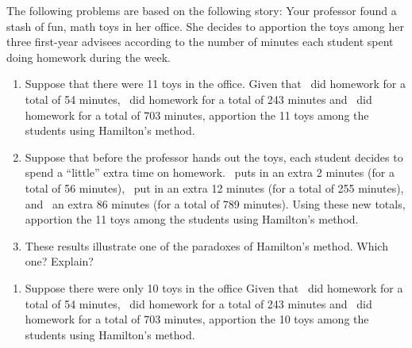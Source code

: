 \clearpage
\HOMEWORK
The following problems are based on the following story:  Your professor found a stash of fun, math toys in her office.  She decides to apportion the toys among her three first-year advisees according to the number of minutes each student spent doing homework during the week.
\begin{Denumerate}
\item \studentrand \begin{enumerate}
	\item Suppose that there were 11 toys in the office.  Given that \randstudent[1]\ did homework for a total of 54 minutes, \randstudent[2]\ did homework for a total of 243 minutes and \randstudent[3]\ did homework for a total of 703 minutes, apportion the 11 toys among the students using Hamilton's method.
	\vfill \label{AppPar1}
	\item Suppose that before the professor hands out the toys, each student decides to spend a ``little'' extra time on homework.  \randstudent[1]\ puts in an extra 2 minutes (for a total of 56 minutes), \randstudent[2]\ put in an extra 12 minutes (for a total of 255 minutes), and \randstudent[3]\ an extra 86 minutes (for a total of 789 minutes).  Using these new totals, apportion the 11 toys among the students using Hamilton's method.
	\vfill
	\item These results illustrate one of the paradoxes of Hamilton's method.  Which one?  Explain? 
	\vfill
	\end{enumerate}
	
	\hwnewpage
\item \begin{enumerate}
	\item Suppose there were only 10 toys in the office Given that \randstudent[1]\ did homework for a total of 54 minutes, \randstudent[2]\ did homework for a total of 243 minutes and \randstudent[3]\ did homework for a total of 703 minutes, apportion the 10 toys among the students using Hamilton's method. 


\end{enumerate}
\end{Denumerate}
